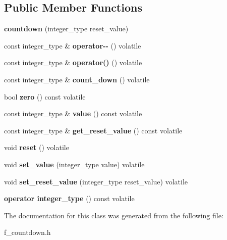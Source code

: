 \subsection*{Public Member Functions}
\begin{DoxyCompactItemize}
\item 
\mbox{\label{classfsl_1_1lg_1_1countdown_a651418be85fd805c5b6208eb11d09f35}} 
{\bfseries countdown} (integer\+\_\+type reset\+\_\+value)
\item 
\mbox{\label{classfsl_1_1lg_1_1countdown_ac0feae8459a786540a3b3165271e8240}} 
const integer\+\_\+type \& {\bfseries operator-\/-\/} () volatile
\item 
\mbox{\label{classfsl_1_1lg_1_1countdown_a6eaf30b82673f5599acaa2606777d7b2}} 
const integer\+\_\+type \& {\bfseries operator()} () volatile
\item 
\mbox{\label{classfsl_1_1lg_1_1countdown_a478593b4d39e83f263b2a814e4e54ac6}} 
const integer\+\_\+type \& {\bfseries count\+\_\+down} () volatile
\item 
\mbox{\label{classfsl_1_1lg_1_1countdown_addd9845890d00d52f9e453392efd8a14}} 
bool {\bfseries zero} () const volatile
\item 
\mbox{\label{classfsl_1_1lg_1_1countdown_ad35e75099976e263f6f52f7b29348cda}} 
const integer\+\_\+type \& {\bfseries value} () const volatile
\item 
\mbox{\label{classfsl_1_1lg_1_1countdown_a32db30f351da15c05ac037bd15ef7525}} 
const integer\+\_\+type \& {\bfseries get\+\_\+reset\+\_\+value} () const volatile
\item 
\mbox{\label{classfsl_1_1lg_1_1countdown_a9c3b59b38cbc5e732c6bd8d9c2e3d80a}} 
void {\bfseries reset} () volatile
\item 
\mbox{\label{classfsl_1_1lg_1_1countdown_a2c3694659bb7e896b7747883d3b49fab}} 
void {\bfseries set\+\_\+value} (integer\+\_\+type value) volatile
\item 
\mbox{\label{classfsl_1_1lg_1_1countdown_a375acbe4e71aaace1da66596933ec87b}} 
void {\bfseries set\+\_\+reset\+\_\+value} (integer\+\_\+type reset\+\_\+value) volatile
\item 
\mbox{\label{classfsl_1_1lg_1_1countdown_a2afec76116b0f7b1f66de2c5998126bb}} 
{\bfseries operator integer\+\_\+type} () const volatile
\end{DoxyCompactItemize}


The documentation for this class was generated from the following file\+:\begin{DoxyCompactItemize}
\item 
f\+\_\+countdown.\+h\end{DoxyCompactItemize}
